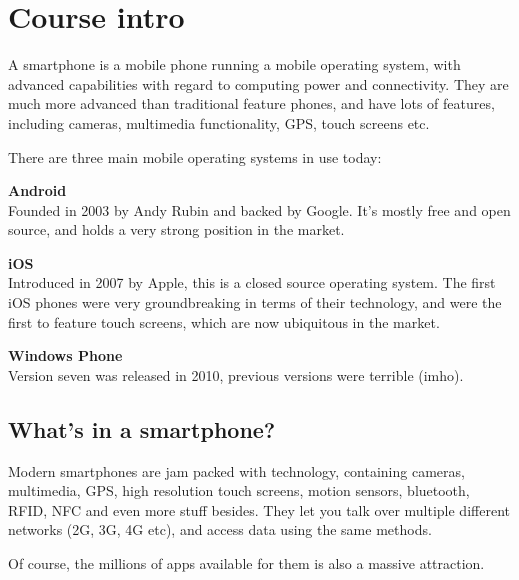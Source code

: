 
\section{Course intro}

A smartphone is a mobile phone running a mobile operating system, with advanced
capabilities with regard to computing power and connectivity. They are much more
advanced than traditional feature phones, and have lots of features, including
cameras, multimedia functionality, GPS, touch screens etc.

There are three main mobile operating systems in use today:

\begin{description}
  \item \textbf{Android}\\
  	Founded in 2003 by Andy Rubin and backed by Google. It's mostly free and
  	open source, and holds a very strong position in the market.
  \item \textbf{iOS}\\
  	Introduced in 2007 by Apple, this is a closed source operating system. The
  	first iOS phones were very groundbreaking in terms of their technology, and
  	were the first to feature touch screens, which are now ubiquitous in the
  	market.


  \item \textbf{Windows Phone}\\
    Version seven was released in 2010, previous versions were terrible (imho).
\end{description}

\subsection{What's in a smartphone?}

Modern smartphones are jam packed with technology, containing cameras,
multimedia, GPS, high resolution touch screens, motion sensors, bluetooth, RFID,
NFC and even more stuff besides. They let you talk over multiple different
networks (2G, 3G, 4G etc), and access data using the same methods.

Of course, the millions of apps available for them is also a massive attraction.

